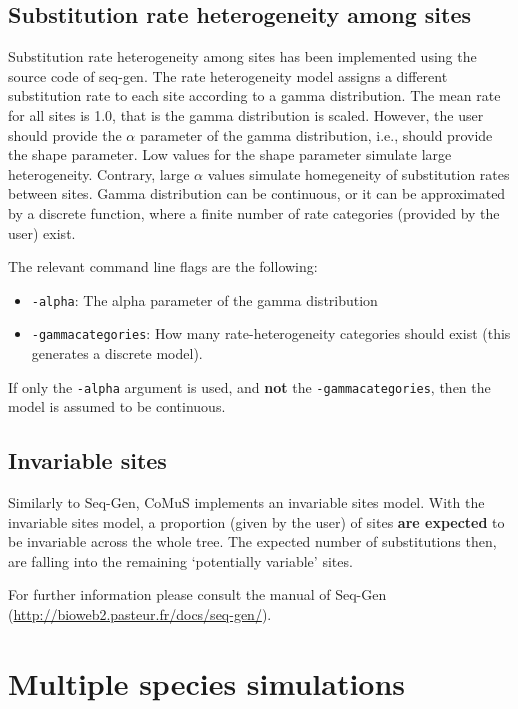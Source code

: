 \subsection{Substitution rate heterogeneity among sites}
Substitution rate heterogeneity among sites has been implemented using the source code of seq-gen. The rate heterogeneity model assigns a different substitution rate to each site according to a gamma distribution. The mean rate for all sites is 1.0, that is the gamma distribution is scaled. However, the user should provide the $\alpha$ parameter of the gamma distribution, i.e., should provide the shape parameter. Low values for the shape parameter simulate large heterogeneity. Contrary, large $\alpha$ values simulate homegeneity of substitution rates between sites. Gamma distribution can be continuous, or it can be approximated by a discrete function, where a finite number of rate categories (provided by the user) exist. 

The relevant command line flags are the following:

\begin{itemize}
\item \verb!-alpha!: The alpha parameter of the gamma distribution
\item \verb!-gammacategories!: How many rate-heterogeneity categories should exist (this generates a discrete model).
\end{itemize}

If only the \verb!-alpha! argument is used, and {\bf not} the \verb!-gammacategories!, then the model is assumed to be continuous. 


\subsection{Invariable sites}
Similarly to Seq-Gen, CoMuS implements an invariable sites model. With the invariable sites model, a proportion (given by the user) of sites {\bf are expected} to be invariable across the whole tree. The expected number of substitutions then, are falling into the remaining `potentially variable' sites. 

For further information please consult the manual of Seq-Gen (\url{http://bioweb2.pasteur.fr/docs/seq-gen/}). 


\section{Multiple species simulations}

